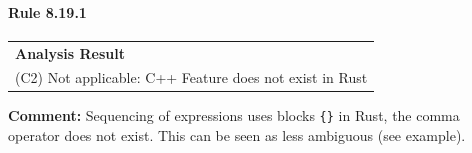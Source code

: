 \paragraph{Rule 8.19.1}
\begin{longtable}{p{13cm}}
\textbf{Analysis Result} \\
(C2) Not applicable: C++ Feature does not exist in Rust \\
\end{longtable}
\textbf{Comment:} Sequencing of expressions uses blocks \texttt{\{\}} in Rust, the comma operator does not exist. This can be seen as less ambiguous (see example). \\



